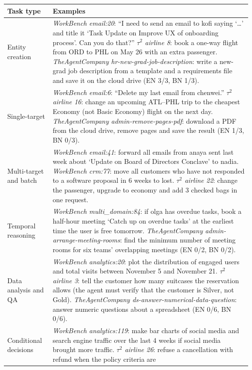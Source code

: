 \documentclass[11pt]{article}
\begin{document}
\begin{table}[t]
\centering\footnotesize
\begin{tabular}{L{2.8cm}L{12.0cm}}
\toprule
Task type & Examples \\
\midrule
Entity creation & \textit{WorkBench email:20}: ``I need to send an email to kofi saying `\ldots' and
title it `Task Update on Improve UX of onboarding process'. Can you do that?''
\textit{$\tau^2$ airline 8}: book a one-way flight from ORD to PHL on May 26 with an extra
passenger. \textit{TheAgentCompany hr-new-grad-job-description}: write a new-grad job
description from a template and a requirements file and save it on the cloud drive (EN 3/3,
BN 1/3). \\
Single-target & \textit{WorkBench email:6}: ``Delete my last email from chenwei.''
\textit{$\tau^2$ airline 16}: change an upcoming ATL--PHL trip to the cheapest Economy (not
Basic Economy) flight on the next day. \textit{TheAgentCompany admin-remove-pages-pdf}:
download a PDF from the cloud drive, remove pages and save the result (EN 1/3, BN 0/3). \\
Multi-target and batch & \textit{WorkBench email:41}: forward all emails from anaya sent last
week about `Update on Board of Directors Conclave' to nadia. \textit{WorkBench crm:77}: move
all customers who have not responded to a software proposal in 6 weeks to lost.
\textit{$\tau^2$ airline 22}: change the passenger, upgrade to economy and add 3 checked bags
in one request. \\
Temporal reasoning & \textit{WorkBench multi\_domain:84}: if olga has overdue tasks, book a
half-hour meeting `Catch up on overdue tasks' at the earliest time the user is free tomorrow.
\textit{TheAgentCompany admin-arrange-meeting-rooms}: find the minimum number of meeting rooms
for six teams' overlapping meetings (EN 0/2, BN 0/2). \\
Data analysis and QA & \textit{WorkBench analytics:20}: plot the distribution of engaged users
and total visits between November 5 and November 21. \textit{$\tau^2$ airline 3}: tell the
customer how many suitcases the reservation allows (the agent must verify that the customer is
Silver, not Gold). \textit{TheAgentCompany ds-answer-numerical-data-question}: answer numeric
questions about a spreadsheet (EN 0/6, BN 0/6). \\
Conditional decisions & \textit{WorkBench analytics:119}: make bar charts of social media and
search engine traffic over the last 4 weeks if social media brought more traffic.
\textit{$\tau^2$ airline 26}: refuse a cancellation with refund when the policy criteria are

\end{tabular}
\end{table}
\end{document}
